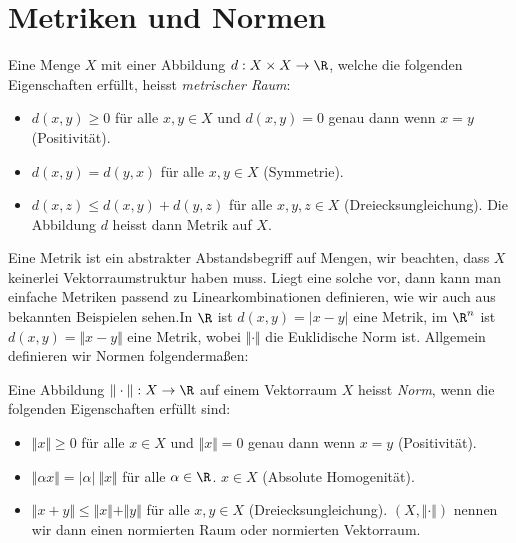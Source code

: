 \documentclass[letterpaper,10pt,english]{jupyterBook}
\begin{document}
\section{Metriken und Normen}
\label{\detokenize{metrik/normen:metriken-und-normen}}\label{\detokenize{metrik/normen::doc}}\label{metrik/normen:definition-0}
\begin{definition}{}{}



Eine Menge \(X\) mit einer Abbildung \(d: X \times X \rightarrow \R\), welche die folgenden Eigenschaften erfüllt, heisst \emph{metrischer Raum}:
\begin{itemize}
\item {} 
\(d(x,y) \geq 0\) für alle \(x,y \in X\) und \(d(x,y) = 0\) genau dann wenn \(x=y\) (Positivität).

\item {} 
\(d(x,y) = d(y,x)\) für alle \(x,y \in X\)  (Symmetrie).

\item {} 
\(d(x,z) \leq d(x,y) + d(y,z)\) für alle \(x,y,z \in X\)  (Dreiecksungleichung).
Die Abbildung \(d\) heisst dann Metrik auf \(X\).

\end{itemize}
\end{definition}

Eine Metrik ist ein abstrakter Abstandsbegriff auf Mengen, wir beachten, dass \(X\) keinerlei Vektorraumstruktur haben muss.  Liegt eine solche vor, dann kann man einfache Metriken passend zu Linearkombinationen definieren, wie wir auch aus bekannten Beispielen sehen.In \(\R\) ist \(d(x,y) = |x-y|\) eine Metrik, im \(\R^n\) ist \(d(x,y) = \Vert x -y \Vert \) eine Metrik, wobei \(\Vert \cdot \Vert\) die Euklidische Norm ist. Allgemein definieren wir Normen folgendermaßen:
\label{metrik/normen:definition-1}
\begin{definition}{}{}



Eine Abbildung \(\Vert \cdot \Vert:X\rightarrow \R\) auf einem Vektorraum \(X\) heisst \emph{Norm}, wenn die folgenden Eigenschaften erfüllt sind:
\begin{itemize}
\item {} 
\(\Vert x \Vert \geq 0\) für alle \(x \in X\) und \(\Vert x \Vert = 0\) genau dann wenn \(x=y\) (Positivität).

\item {} 
\(\Vert \alpha x \Vert = |\alpha|~\Vert x \Vert\) für alle \(\alpha \in \R\). \(x\in X\)  (Absolute Homogenität).

\item {} 
\(\Vert x+y \Vert \leq\Vert x  \Vert + \Vert y  \Vert\) für alle \(x,y  \in X\)  (Dreiecksungleichung).
\((X,\Vert \cdot \Vert)\)  nennen wir dann einen normierten Raum oder normierten Vektorraum.

\end{itemize}
\end{definition}
\end{document}
